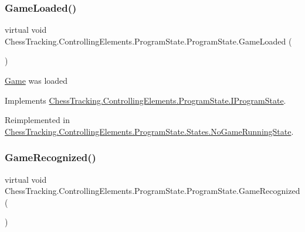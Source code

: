 \subsubsection{\texorpdfstring{GameLoaded()}{GameLoaded()}}
{\footnotesize\ttfamily virtual void Chess\+Tracking.\+Controlling\+Elements.\+Program\+State.\+Program\+State.\+Game\+Loaded (\begin{DoxyParamCaption}{ }\end{DoxyParamCaption})\hspace{0.3cm}{\ttfamily [virtual]}}



\mbox{\hyperlink{namespace_chess_tracking_1_1_game}{Game}} was loaded 



Implements \mbox{\hyperlink{interface_chess_tracking_1_1_controlling_elements_1_1_program_state_1_1_i_program_state_afaaa62756391f219e5318342f9bb568a}{Chess\+Tracking.\+Controlling\+Elements.\+Program\+State.\+I\+Program\+State}}.



Reimplemented in \mbox{\hyperlink{class_chess_tracking_1_1_controlling_elements_1_1_program_state_1_1_states_1_1_no_game_running_state_a1e892271241639d1e2a77739a8e58892}{Chess\+Tracking.\+Controlling\+Elements.\+Program\+State.\+States.\+No\+Game\+Running\+State}}.

\mbox{\label{class_chess_tracking_1_1_controlling_elements_1_1_program_state_1_1_program_state_a5361b01f2091526a01550fa927735889}} 
\subsubsection{\texorpdfstring{GameRecognized()}{GameRecognized()}}
{\footnotesize\ttfamily virtual void Chess\+Tracking.\+Controlling\+Elements.\+Program\+State.\+Program\+State.\+Game\+Recognized (\begin{DoxyParamCaption}{ }\end{DoxyParamCaption})\hspace{0.3cm}{\ttfamily [virtual]}}



